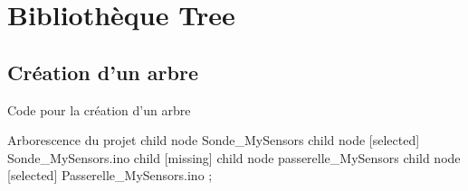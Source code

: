 \chapter {Bibliothèque Tree}

\section{Création d'un arbre}



\begin{Latex}{Code pour la création d'un arbre}
\begin{tree}{Arborescence du projet}
    child { node {Sonde\_MySensors}
        child { node [selected] {Sonde\_MySensors.ino}}
    }
    child [missing] {}		
    child { node {passerelle\_MySensors}
        child { node [selected] {Passerelle\_MySensors.ino}}
    };
\end{tree}
\end{Latex}

